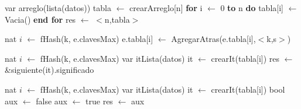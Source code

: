 \disFuncionDeAbsFuncionesAux


\newpage
\disAlgoritmos
\begin{algorithm}[H]
\begin{algorithmic}[1]
 
	\State var arreglo(lista(datos)) tabla $\gets$ crearArreglo[n] 
	\State \textbf{for} i $\gets$ 0 \textbf{to} n \textbf{do} 
  	\State tabla[i] $\gets$ Vacia() 
  	\State \textbf{end for}
  	\State res $\gets$ $<$n,tabla$>$ 
\EndFunction
\end{algorithmic}
\end{algorithm}

\begin{algorithm}[H]
\begin{algorithmic}[1]
 
    \State nat $i$ $\gets$ fHash(k, e.clavesMax) 
    \State e.tabla[i] $\gets$ AgregarAtras(e.tabla[i],$<$k,s$>$) 
\EndFunction
\end{algorithmic}
\end{algorithm}

\begin{algorithm}[H]
\begin{algorithmic}[1]
 
  \State nat $i$ $\gets$ fHash(k, e.clavesMax) 
  \State var itLista(datos) it $\gets$ crearIt(tabla[i])
    \State res $\gets$ &siguiente(it).significado
  \EndIf
  \EndWhile
\EndFunction
\end{algorithmic}
\end{algorithm}



\begin{algorithm}[H]
\begin{algorithmic}[1]
 
  \State nat $i$ $\gets$ fHash(k, e.clavesMax) 
  \State var itLista(datos) it $\gets$ crearIt(tabla[i])
  \State bool aux $\gets$ false
    \State aux $\gets$ true
  \EndIf
  \EndWhile
  \State res $\gets$ aux
\EndFunction
\end{algorithmic}
\end{algorithm}

